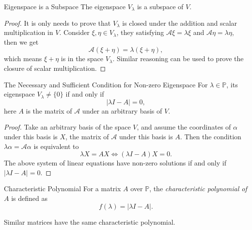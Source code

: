 \begin{proposition}{Eigenspace is a Subspace}{}
  The eigenspace $V_{\lambda}$ is a subspace of $V$.
\end{proposition}

\begin{proof}
  It is only needs to prove that $V_{\lambda}$ is closed under the addition and
  scalar multiplication in $V$.
  Consider $\xi, \eta \in V_{\lambda}$, they satisfying $\mathcal{A}\xi =
  \lambda \xi$ and $\mathcal{A}\eta = \lambda \eta$,
  then we get
  \begin{equation}
    \mathcal{A}(\xi + \eta) = \lambda (\xi + \eta),
  \end{equation}
  which means $\xi + \eta$ is in the space $V_{\lambda}$.
  Similar reasoning can be used to prove the closure of scalar multiplication.
\end{proof}

\begin{proposition}{The Necessary and Sufficient Condition for Non-zero Eigenspace}{}
  For $\lambda \in \mathbb{P}$, its eigenspace $V_{\lambda} \neq \{0\}$ if and
  only if
  \begin{equation}
    |\lambda I - A| = 0,
  \end{equation}
  here $A$ is the matrix of $\mathcal{A}$ under an arbitrary basis of $V$.
\end{proposition}

\begin{proof}
  Take an arbitrary basis of the space $V$,
  and assume the coordinates of $\alpha$ under this basis is $X$,
  the matrix of $\mathcal{A}$ under this basis is $A$.
  Then the condition $\lambda \alpha = \mathcal{A}\alpha$ is equivalent to
  \begin{equation}
    \lambda X = A X \Leftrightarrow (\lambda I - A)X = 0.
  \end{equation}
  The above system of linear equations have non-zero solutions if and only if $|\lambda I
  - A| = 0$.
\end{proof}

\begin{definition}{Characteristic Polynomial}{}
  For a matrix $A$ over $\mathbb{P}$,
  the \emph{characteristic polynomial of $A$} is defined as
  \begin{equation}
    f(\lambda) = |\lambda I - A|.
  \end{equation}
\end{definition}

\begin{proposition}{}{}
  Similar matrices have the same characteristic polynomial.
\end{proposition}

